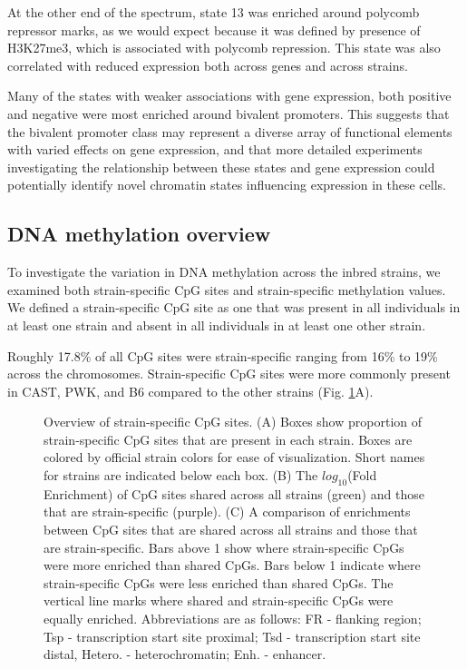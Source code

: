 \documentclass[
  11pt,
]{article}
\begin{document}
At the other end of the spectrum, state 13 was enriched around polycomb
repressor marks, as we would expect because it was defined by presence
of H3K27me3, which is associated with polycomb repression. This state
was also correlated with reduced expression both across genes and across
strains.

Many of the states with weaker associations with gene expression, both
positive and negative were most enriched around bivalent promoters. This
suggests that the bivalent promoter class may represent a diverse array
of functional elements with varied effects on gene expression, and that
more detailed experiments investigating the relationship between these
states and gene expression could potentially identify novel chromatin
states influencing expression in these cells.

\hypertarget{dna-methylation-overview}{%
\subsection{DNA methylation overview}\label{dna-methylation-overview}}

To investigate the variation in DNA methylation across the inbred
strains, we examined both strain-specific CpG sites and strain-specific
methylation values. We defined a strain-specific CpG site as one that
was present in all individuals in at least one strain and absent in all
individuals in at least one other strain.

Roughly 17.8\% of all CpG sites were strain-specific ranging from 16\%
to 19\% across the chromosomes. Strain-specific CpG sites were more
commonly present in CAST, PWK, and B6 compared to the other strains
(Fig. \ref{fig:cpg_overview}A).

\begin{figure}[ht!]
\caption{Overview of strain-specific CpG sites. (A) Boxes 
show proportion of strain-specific CpG sites that are present 
in each strain. Boxes are colored by official strain colors
for ease of visualization. Short names for strains are
indicated below each box. (B) The $log_{10}$(Fold Enrichment)
of CpG sites shared across all strains (green) and those
that are strain-specific (purple). (C) A comparison
of enrichments between CpG sites that are shared across all 
strains and those that are strain-specific. Bars above 1
show where strain-specific CpGs were more enriched than 
shared CpGs. Bars below 1 indicate where strain-specific 
CpGs were less enriched than shared CpGs. The vertical 
line marks where shared and strain-specific CpGs were equally 
enriched. Abbreviations are as follows: FR - flanking region; 
Tsp - transcription start site proximal; Tsd - transcription
start site distal, Hetero. - heterochromatin; Enh. - enhancer.
}
\label{fig:cpg_overview}
\end{figure}
\end{document}
